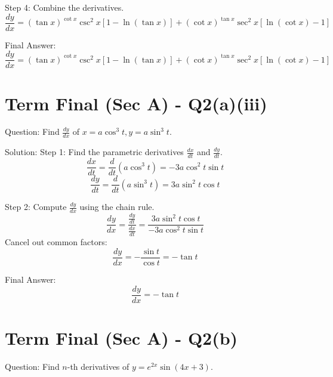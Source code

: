 \documentclass{article}
\begin{document}
Step 4: Combine the derivatives.
\[
\frac{dy}{dx} = (\tan x)^{\cot x} \csc^2 x [1 - \ln(\tan x)] + (\cot x)^{\tan x} \sec^2 x [\ln(\cot x) - 1]
\]

Final Answer:
\[
\boxed{\frac{dy}{dx} = (\tan x)^{\cot x} \csc^2 x [1 - \ln(\tan x)] + (\cot x)^{\tan x} \sec^2 x [\ln(\cot x) - 1]}
\]

\section*{Term Final (Sec A) - Q2(a)(iii)}
Question:
Find $\frac{dy}{dx}$ of $x = a \cos^3 t, y = a \sin^3 t$.

Solution:
Step 1: Find the parametric derivatives $\frac{dx}{dt}$ and $\frac{dy}{dt}$.
\[
\frac{dx}{dt} = \frac{d}{dt} (a \cos^3 t) = -3a \cos^2 t \sin t
\]
\[
\frac{dy}{dt} = \frac{d}{dt} (a \sin^3 t) = 3a \sin^2 t \cos t
\]

Step 2: Compute $\frac{dy}{dx}$ using the chain rule.
\[
\frac{dy}{dx} = \frac{\frac{dy}{dt}}{\frac{dx}{dt}} = \frac{3a \sin^2 t \cos t}{-3a \cos^2 t \sin t}
\]
Cancel out common factors:
\[
\frac{dy}{dx} = -\frac{\sin t}{\cos t} = -\tan t
\]

Final Answer:
\[
\boxed{\frac{dy}{dx} = -\tan t}
\]

\section*{Term Final (Sec A) - Q2(b)}
Question:
Find $n$-th derivatives of $y = e^{2x} \sin(4x+3)$.
\end{document}

